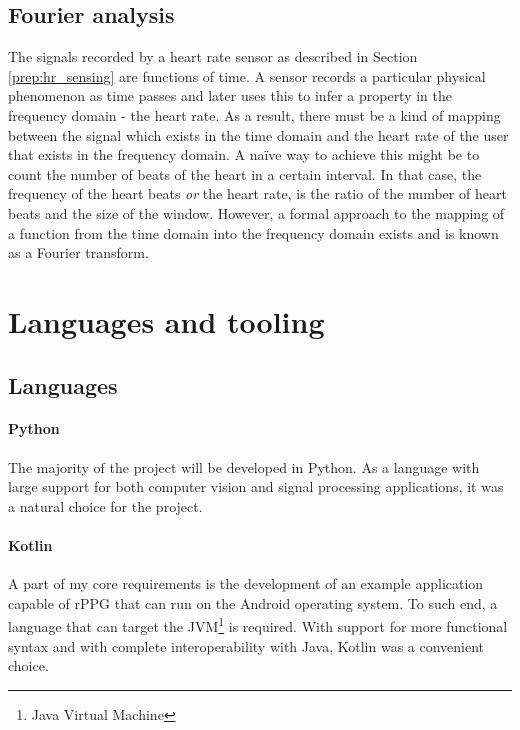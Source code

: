 \subsection{Fourier analysis}
The signals recorded by a heart rate sensor as described in Section \ref{prep:hr_sensing} are functions of time. A sensor records a particular physical 
phenomenon as time passes and later uses this to infer a property in the frequency domain - the heart rate.
As a result, there must be a kind of mapping between the signal which exists in the time domain and the heart rate of the user that exists in the 
frequency domain. A naïve way to achieve this might be to count the number of beats of the heart in a certain interval. In that case, the frequency 
of the heart beats \textit{or} the heart rate, is the ratio of the number of heart beats and the size of the window.
However, a formal approach to the mapping of a function from the time domain into the frequency domain exists and is known as a Fourier transform. 





\section{Languages and tooling}
\subsection{Languages}
\paragraph{Python}
The majority of the project will be developed in Python. As a language with large support for both computer vision and signal processing applications, it
was a natural choice for the project. 

\paragraph{Kotlin}
A part of my core requirements is the development of an example application capable of rPPG that can run on the Android operating system. To such end, a language that can target the JVM\footnote{Java Virtual Machine} is required. With support for more functional syntax and with complete interoperability with Java, Kotlin was a convenient choice.


